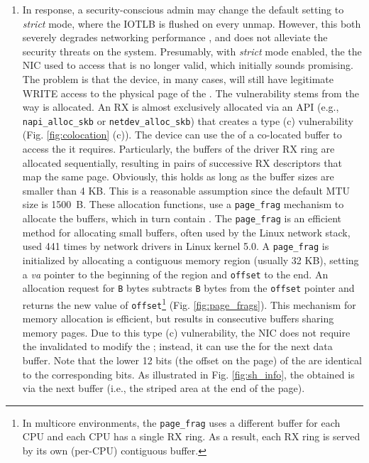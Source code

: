 \begin{enumerate}[label=(\roman*)]
\item In response, a security-conscious admin may change the default setting to \emph{strict} mode, where the IOTLB is flushed on every unmap. However, this both severely degrades networking performance \cite{MMT16,MSMT18}, and does not alleviate the security threats on the system. Presumably, with \emph{strict} mode enabled, the \iova{} the NIC used to access that \shinfo{} is no longer valid, which initially sounds promising. The problem is that the device, in many cases, will still have legitimate WRITE access to the physical page of the \shinfo. The vulnerability stems from the way \data{} is allocated. An RX \skb{} is almost exclusively allocated via an API (e.g., \texttt{napi\_alloc\_skb} or \texttt{netdev\_alloc\_skb}) that creates a type (c) \subpage{} vulnerability (Fig. \ref{fig:colocation} (c)). The device can use the \iova{} of a co-located buffer to access the \shinfo{} it requires. Particularly, the buffers of the driver RX ring are allocated sequentially, resulting in pairs of successive RX descriptors that map the same page. Obviously, this holds as long as the buffer sizes are smaller than 4 KB. This is a reasonable assumption since the default MTU size is 1500~B. These allocation functions, use a \texttt{page\_frag} mechanism to allocate the \data{} buffers, which in turn contain \shinfo. The \texttt{page\_frag} is an efficient method for allocating small buffers, often used by the Linux network stack, used 441 times by network drivers in Linux kernel 5.0. A \texttt{page\_frag} is initialized by allocating a contiguous memory region (usually 32 KB), setting a \textit{va} pointer to the beginning of the region and \texttt{offset} to the end. An allocation request for \texttt{B} bytes subtracts \texttt{B} bytes from the \texttt{offset} pointer and returns the new value of \texttt{offset}\footnote{In multicore environments, the \texttt{page\_frag} uses a different buffer for each CPU and each CPU has a single RX ring. As a result, each RX ring is served by its own (per-CPU) contiguous buffer.} (Fig. \ref{fig:page_frags}). This mechanism for memory allocation is efficient, but results in consecutive \data{} buffers sharing memory pages. Due to this type (c) \subpage{} vulnerability, the NIC does not require the invalidated \iova{} to modify the \shinfo; instead, it can use the \iova{} for the next data buffer. Note that the lower 12 bits (the offset on the page) of the \iova{} are identical to the corresponding \kva{} bits. As illustrated in Fig. \ref{fig:sh_info}, the \oportunity{} obtained is via the next buffer (i.e., the striped area at the end of the page).
\end{enumerate}

